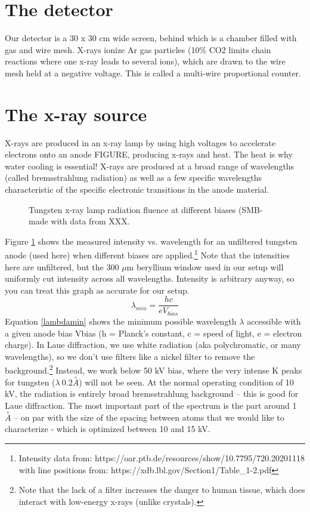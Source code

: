 \section{The detector}
Our detector is a 30 x 30 cm wide screen, behind which is a chamber filled with gas and wire mesh. X-rays ionize Ar gas particles (10\% CO2 limits chain reactions where one x-ray leads to several ions), which are drawn to the wire mesh held at a negative voltage. This is called a multi-wire proportional counter.

\section{The x-ray source}
X-rays are produced in an x-ray lamp by using high voltages to accelerate electrons onto an anode FIGURE, producing x-rays and heat. The heat is why water cooling is essential! X-rays are produced at a broad range of wavelengths (called bremsstrahlung radiation) as well as a few specific wavelengths characteristic of the specific electronic transitions in the anode material.
\begin{figure}[htbp]
  \centering
  
  \caption{Tungsten x-ray lamp radiation fluence at different biases (SMB-made with data from XXX.}
  \label{Wradiation}
\end{figure}
Figure \ref{Wradiation} shows the measured intensity vs. wavelength for an unfiltered tungsten anode (used here) when different biases are applied.\footnote{Intensity data from: https://oar.ptb.de/resources/show/10.7795/720.20201118 with line positions from: https://xdb.lbl.gov/Section1/Table_1-2.pdf }  Note that the intensities here are unfiltered, but the 300 $\mu$m beryllium window used in our setup will uniformly cut intensity across all wavelengths. Intensity is arbitrary anyway, so you can treat this graph as accurate for our setup.
\begin{equation}
    \lambda_{min} = \frac{hc}{eV_{bias} }
    \label{lambdamin}
\end{equation}
Equation \ref{lambdamin} shows the minimum possible wavelength $\lambda$ accessible with a given anode bias Vbias (h = Planck’s constant, c = speed of light, e = electron charge). In Laue diffraction, we use white radiation (aka polychromatic, or many wavelengths), so we don’t use filters like a nickel filter to remove the background.\footnote{Note that the lack of a filter increases the danger to human tissue, which does interact with low-energy x-rays (unlike crystals).} Instead, we work below 50 kV bias, where the very intense K peaks for tungsten ($\lambda~0.2 \overset{\circ}{A}$) will not be seen. At the normal operating condition of 10 kV, the radiation is entirely broad bremsstrahlung background – this is good for Laue diffraction. The most important part of the spectrum is the part around 1 $\overset{\circ}{A}$ – on par with the size of the spacing between atoms that we would like to characterize - which is optimized between 10 and 15 kV.
